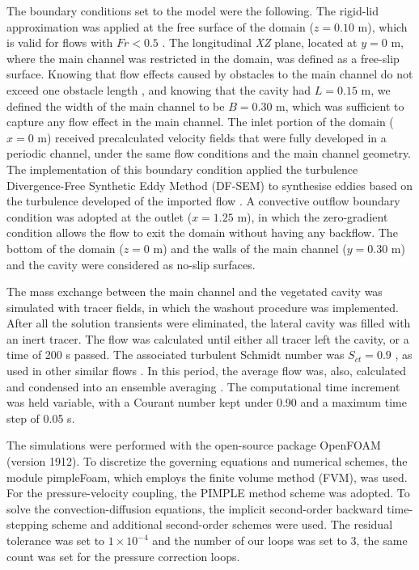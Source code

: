 The boundary conditions set to the model were the following. The rigid-lid approximation was applied at the free surface of the domain ($z = 0.10$ m), which is valid for flows with $Fr < 0.5$ \cite{alfrink1983}. The longitudinal \textit{XZ} plane, located at $y=0$ m, where the main channel was restricted in the domain, was defined as a free-slip surface. Knowing that flow effects caused by obstacles to the main channel do not exceed one obstacle length \cite{Brevis2014}, and knowing that the cavity had $L=0.15$ m, we defined the width of the main channel to be $B=0.30$ m, which was sufficient to capture any flow effect in the main channel. The inlet portion of the domain ($x=0$ m) received precalculated velocity fields that were fully developed in a periodic channel, under the same flow conditions and the main channel geometry. The implementation of this boundary condition applied the turbulence Divergence-Free Synthetic Eddy Method (DF-SEM) to synthesise eddies based on the turbulence developed of the imported flow \cite{poletto2013}. A convective outflow boundary condition was adopted at the outlet ($x = 1.25$ m), in which the zero-gradient condition allows the flow to exit the domain without having any backflow. The bottom of the domain ($z = 0$ m) and the walls of the main channel ($y = 0.30$ m) and the cavity were considered as no-slip surfaces. 

The mass exchange between the main channel and the vegetated cavity was simulated with tracer fields, in which the washout procedure was implemented. After all the solution transients were eliminated, the lateral cavity was filled with an inert tracer. The flow was calculated until either all tracer left the cavity, or a time of 200 s passed. The associated turbulent Schmidt number was $S_{ct}=0.9$ , as used in other similar flows \cite{Gualtieri2017}. In this period, the average flow was, also, calculated and condensed into an ensemble averaging \cite{sukhodolov2014}. The computational time increment was held variable, with a Courant number kept under 0.90 and a maximum time step of 0.05 s.

The simulations were performed with the open-source package OpenFOAM (version 1912). To discretize the governing equations and numerical schemes, the module pimpleFoam, which employs the finite volume method (FVM), was used. For the pressure-velocity coupling, the PIMPLE method scheme was adopted. To solve the convection-diffusion equations, the implicit second-order backward time-stepping scheme and additional second-order schemes were used. The residual tolerance was set to $1 \times 10^{-4}$ and the number of our loops was set to 3, the same count was set for the pressure correction loops.

